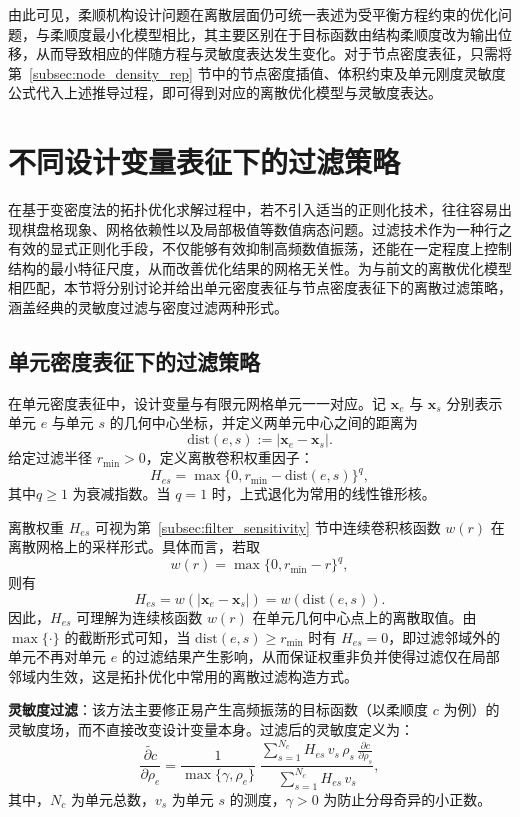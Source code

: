 由此可见，柔顺机构设计问题在离散层面仍可统一表述为受平衡方程约束的优化问题，与柔顺度最小化模型相比，其主要区别在于目标函数由结构柔顺度改为输出位移，从而导致相应的伴随方程与灵敏度表达发生变化。对于节点密度表征，只需将第~\ref{subsec:node_density_rep} 节中的节点密度插值、体积约束及单元刚度灵敏度公式代入上述推导过程，即可得到对应的离散优化模型与灵敏度表达。


\section{不同设计变量表征下的过滤策略}
\label{sec:diff_design_var_filtering}

在基于变密度法的拓扑优化求解过程中，若不引入适当的正则化技术，往往容易出现棋盘格现象、网格依赖性以及局部极值等数值病态问题。过滤技术作为一种行之有效的显式正则化手段，不仅能够有效抑制高频数值振荡，还能在一定程度上控制结构的最小特征尺度，从而改善优化结果的网格无关性。为与前文的离散优化模型相匹配，本节将分别讨论并给出单元密度表征与节点密度表征下的离散过滤策略，涵盖经典的灵敏度过滤与密度过滤两种形式。


\subsection{单元密度表征下的过滤策略}
\label{subsec:cell_density_filtering}

在单元密度表征中，设计变量与有限元网格单元一一对应。记 $\boldsymbol{x}_e$ 与 $\boldsymbol{x}_s$ 分别表示单元 $e$ 与单元 $s$ 的几何中心坐标，并定义两单元中心之间的距离为
\[
\mathrm{dist}(e,s) := \vert\boldsymbol{x}_e - \boldsymbol{x}_s\vert.
\]
给定过滤半径 $r_{\min}>0$，定义离散卷积权重因子：
\[
H_{es} = \max\{0,r_{\min} - \mathrm{dist}(e,s)\}^q,
\]
其中$q \geq 1$ 为衰减指数。当 $q=1$ 时，上式退化为常用的线性锥形核。

离散权重 $H_{es}$ 可视为第~\ref{subsec:filter_sensitivity} 节中连续卷积核函数 $w(r)$ 在离散网格上的采样形式。具体而言，若取
\[
w(r) = \max\{0, r_{\min} - r\}^q,
\]
则有
\[
H_{es} = w(\vert\boldsymbol{x}_e - \boldsymbol{x}_s\vert) = w(\mathrm{dist}(e,s)).
\]
因此，$H_{es}$ 可理解为连续核函数 $w(r)$ 在单元几何中心点上的离散取值。由 $\max\{\cdot\}$ 的截断形式可知，当 $\mathrm{dist}(e,s)\ge r_{\min}$ 时有 $H_{es}=0$，即过滤邻域外的单元不再对单元 $e$ 的过滤结果产生影响，从而保证权重非负并使得过滤仅在局部邻域内生效，这是拓扑优化中常用的离散过滤构造方式。

\textbf{灵敏度过滤}：该方法主要修正易产生高频振荡的目标函数（以柔顺度 $c$ 为例）的灵敏度场，而不直接改变设计变量本身。过滤后的灵敏度定义为：
\begin{equation} \label{eq:ch3_cell_sens_filter}
	\widetilde{\frac{\partial c}{\partial \rho_e}} = \frac{1}{\max\{\gamma,\rho_e\}}\; \frac{\sum_{s=1}^{N_c}H_{es}\,v_s\,\rho_s\, \frac{\partial c}{\partial \rho_s}} {\sum_{s=1}^{N_c}H_{es}\,v_s},
\end{equation}
其中，$N_c$ 为单元总数，$v_s$ 为单元 $s$ 的测度，$\gamma>0$ 为防止分母奇异的小正数。

